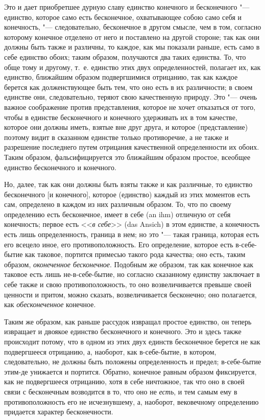 Это и дает приобретшее дурную славу единство конечного и бесконечного
"--- единство, которое само есть бесконечное, охватывающее собою само себя и
конечность, "--- следовательно, бесконечное в другом смысле, чем в том,
согласно которому конечное отделено от него и поставлено на другой стороне;
так как они должны быть также и различны, то каждое, как мы показали
раньше, есть само в себе единство обоих; таким образом, получаются два
таких единства. То, что обще тому и другому, т.~е. единство этих двух
определенностей, полагает их, как единство, ближайшим образом подвергшимися
отрицанию, так как каждое берется как долженствующее быть тем, что оно есть
в их различности; в своем единстве они, следовательно, теряют свою
качественную природу. Это "--- очень важное соображение против представления,
которое не хочет отказаться от того, чтобы в единстве бесконечного и
конечного удерживать их в том качестве, которое они должны иметь, взятые
вне друг друга, и которое (представление) поэтому видит в сказанном
единстве только противоречие, а не также и разрешение последнего путем
отрицания качественной определенности их обоих. Таким образом,
фальсифицируется это ближайшим образом простое, всеобщее единство
бесконечного и конечного.

Но, далее, так как они должны быть взяты также и как различные, то единство
бесконечного [и конечного], которое (единство) каждый из этих моментов есть
сам, определено в каждом из них различным образом. То, что по своему
определению есть бесконечное, имеет в себе (an ihm) отличную от себя
конечность; первое есть <<{\em в себе}>> (das Ansich) в
этом единстве, а конечность есть лишь определенность, граница в нем; но это
"--- такая граница, которая есть его всецело иное, его
противоположность. Его определение, которое есть в-себе-бытие как таковое,
портится примесью такого рода качества; оно есть, таким образом,
{\em оконеченное бесконечное}. Подобным же образом, так
как конечное как таковое есть лишь не-в-себе-бытие, но согласно сказанному
единству заключает в себе также и свою противоположность, то оно
возвеличивается превыше своей ценности и притом, можно сказать,
возвеличивается бесконечно; оно полагается, как
{\em обесконеченное} конечное.

Таким же образом, как раньше рассудок извращал простое единство, он
теперь извращает и двоякое единство бесконечного и конечного.
Это и здесь также происходит потому, что в одном из этих двух единств
бесконечное берется не как подвергшееся отрицанию, а, наоборот, как
в-себе-бытие, в котором, следовательно, не должны быть положены
определенность и предел; в-себе-бытие этим-де унижается и портится.
Обратно, конечное равным образом фиксируется, как не подвергшееся
отрицанию, хотя в себе ничтожное, так что оно в своей связи с бесконечным
возводится в то, что оно не {\em есть}, и тем самым ему
в противоположность его не исчезнувшему, а, наоборот, вековечному
определению придается характер бесконечности.

